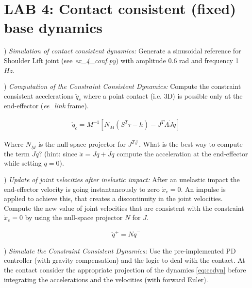 \documentclass{report}
\begin{document}
\section*{LAB 4: Contact consistent (fixed) base dynamics}


\quad

) \textit{Simulation of contact consistent dynamics:}
Generate a sinusoidal reference for Shoulder Lift  joint (see \textit{ex\_4\_conf.py}) with amplitude 0.6 rad and frequency 1 $Hz$.

\quad

) \textit{Computation of the Constraint Consistent Dynamics:}
Compute the constraint consistent accelerations $\ddot{q}_c$ where a point  contact (i.e. 3D) is possible only at the end-effector (\textit{ee\_link} frame). 

\begin{align}
\ddot{q}_c = M^{-1}[ N_{\bar{M}}(S^T\tau- h ) - J^T\Lambda \dot{J}\dot{q}  ]
\label{eq:ccdyn}
\end{align}

Where $N_{\bar{M}}$ is the null-space projector for $J^{T \#}$. What is the best way to compute the term $\dot{J}\dot{q}$? 
(hint: since $\ddot{x} = J\ddot{q} + \dot{J}\dot{q}$ compute the acceleration at the end-effector while setting $\ddot{q}=0$).

\quad

) \textit{Update of joint velocities after inelastic impact:}
After an unelastic impact the end-effector velocity is going instantaneously to zero $\dot{x}_e =0$. 
An impulse is applied to achieve this, that creates a
discontinuity in the joint velocities. 
Compute the new value of joint velocities that are consistent with the constraint $\dot{x}_e =0$ 
by using the null-space projector $N$ for $J$.

\begin{align}
\ddot{q}^{+} = N \dot{q}^{-} 
\end{align}


\quad

) \textit{Simulate the Constraint Consistent Dynamics:}
Use the pre-implemented PD controller (with gravity compensation) and the logic to deal with the contact. 
At the contact consider the appropriate projection of the dynamics \eqref{eq:ccdyn} before 
integrating the accelerations and the velocities (with forward Euler). 
\end{document}
